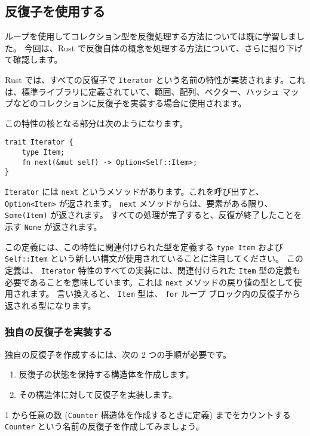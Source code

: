 \subsection{反復子を使用する}

ループを使用してコレクション型を反復処理する方法については既に学習しました。 今回は、Rust で反復自体の概念を処理する方法について、さらに掘り下げて確認します。

Rust では、すべての反復子で \texttt{Iterator} という名前の特性が実装されます。これは、標準ライブラリに定義されていて、範囲、配列、ベクター、ハッシュ マップなどのコレクションに反復子を実装する場合に使用されます。

この特性の核となる部分は次のようになります。

\begin{lstlisting}[numbers=none]
trait Iterator {
    type Item;
    fn next(&mut self) -> Option<Self::Item>;
}
\end{lstlisting}

\texttt{Iterator} には \texttt{next} というメソッドがあります。これを呼び出すと、 \texttt{Option<Item>} が返されます。 \texttt{next} メソッドからは、要素がある限り、 \texttt{Some(Item)} が返されます。 すべての処理が完了すると、反復が終了したことを示す \texttt{None} が返されます。

この定義には、この特性に関連付けられた型を定義する \texttt{type Item} および \texttt{Self::Item} という新しい構文が使用されていることに注目してください。 この定義は、 \texttt{Iterator} 特性のすべての実装には、関連付けられた \texttt{Item} 型の定義も必要であることを意味しています。これは \texttt{next} メソッドの戻り値の型として使用されます。 言い換えると、 \texttt{Item} 型は、 \texttt{for} ループ ブロック内の反復子から返される型になります。

\subsubsection{独自の反復子を実装する}

独自の反復子を作成するには、次の 2 つの手順が必要です。

\begin{enumerate}
\item 反復子の状態を保持する構造体を作成します。
\item その構造体に対して反復子を実装します。
\end{enumerate}

1 から任意の数 (\texttt{Counter} 構造体を作成するときに定義) までをカウントする \texttt{Counter} という名前の反復子を作成してみましょう。

